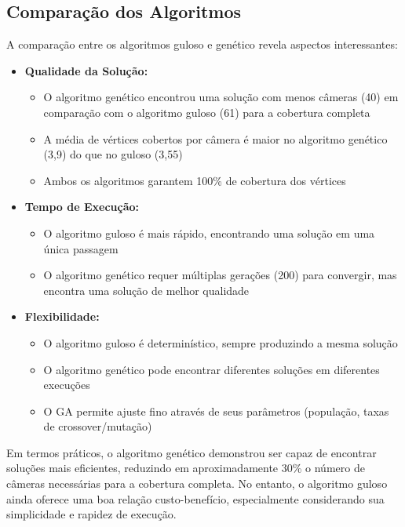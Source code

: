 \documentclass[12pt, a4paper]{report}
\begin{document}
\subsection{Comparação dos Algoritmos}
A comparação entre os algoritmos guloso e genético revela aspectos interessantes:

\begin{itemize}
    \item \textbf{Qualidade da Solução:}
    \begin{itemize}
        \item O algoritmo genético encontrou uma solução com menos câmeras (40) em comparação com o algoritmo guloso (61) para a cobertura completa
        \item A média de vértices cobertos por câmera é maior no algoritmo genético (3,9) do que no guloso (3,55)
        \item Ambos os algoritmos garantem 100\% de cobertura dos vértices
    \end{itemize}
    
    \item \textbf{Tempo de Execução:}
    \begin{itemize}
        \item O algoritmo guloso é mais rápido, encontrando uma solução em uma única passagem
        \item O algoritmo genético requer múltiplas gerações (200) para convergir, mas encontra uma solução de melhor qualidade
    \end{itemize}
    
    \item \textbf{Flexibilidade:}
    \begin{itemize}
        \item O algoritmo guloso é determinístico, sempre produzindo a mesma solução
        \item O algoritmo genético pode encontrar diferentes soluções em diferentes execuções
        \item O GA permite ajuste fino através de seus parâmetros (população, taxas de crossover/mutação)
    \end{itemize}
\end{itemize}

Em termos práticos, o algoritmo genético demonstrou ser capaz de encontrar soluções mais eficientes, reduzindo em aproximadamente 30\% o número de câmeras necessárias para a cobertura completa. No entanto, o algoritmo guloso ainda oferece uma boa relação custo-benefício, especialmente considerando sua simplicidade e rapidez de execução.
\end{document}
